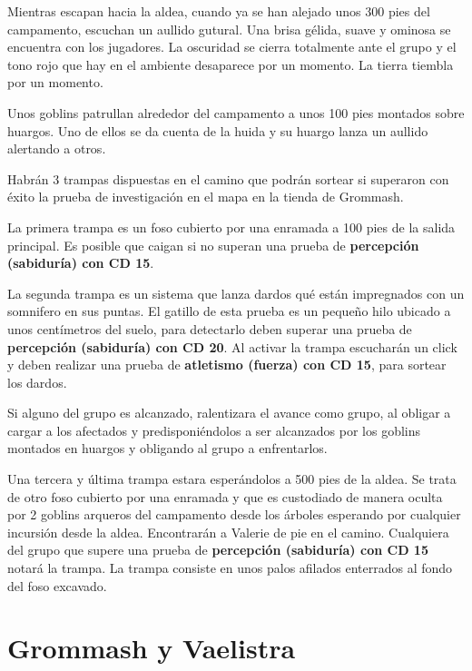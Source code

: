 \documentclass[10pt,twoside,twocolumn,openany]{dndbook}
\begin{document}
\begin{DndReadAloud}
Mientras escapan hacia la aldea, cuando ya se han alejado unos 300 pies del campamento, escuchan 
un aullido gutural. Una brisa gélida, suave y ominosa se encuentra con los jugadores. La oscuridad
se cierra totalmente ante el grupo y el tono rojo que hay en el ambiente desaparece por un momento.
La tierra tiembla por un momento.
\end{DndReadAloud}

Unos goblins patrullan alrededor del campamento a unos 100 pies montados sobre huargos. Uno de 
ellos se da cuenta de la huida y su huargo lanza un aullido alertando a otros.

Habrán 3 trampas dispuestas en el camino que podrán sortear si superaron con éxito la prueba de 
investigación en el mapa en la tienda de Grommash. 

La primera trampa es un foso cubierto por una enramada a 100 pies de la salida principal. Es 
posible que caigan si no superan una prueba de \textbf{percepción (sabiduría) con CD 15}.

La segunda trampa es un sistema que lanza dardos qué están impregnados con un somnifero en sus 
puntas. El gatillo de esta prueba es un pequeño hilo ubicado a unos centímetros del suelo, para 
detectarlo deben superar una prueba de \textbf{percepción (sabiduría) con CD 20}. Al activar la 
trampa escucharán un click y deben realizar una prueba de \textbf{atletismo (fuerza) con CD 15}, 
para sortear los dardos.

Si alguno del grupo es alcanzado, ralentizara el avance como grupo, al obligar a cargar a los 
afectados y predisponiéndolos a ser alcanzados por los goblins montados en huargos y obligando al 
grupo a enfrentarlos.

Una tercera y última trampa estara esperándolos a 500 pies de la aldea. Se trata de otro foso 
cubierto por una enramada y que es custodiado de manera oculta por 2 goblins arqueros del campamento 
desde los árboles esperando por cualquier incursión desde la aldea. Encontrarán a Valerie de pie en 
el camino. Cualquiera del grupo que supere una prueba de \textbf{percepción (sabiduría) con CD 15} 
notará la trampa. La trampa consiste en unos palos afilados enterrados al fondo del foso excavado.

\section{Grommash y Vaelistra}
\end{document}
